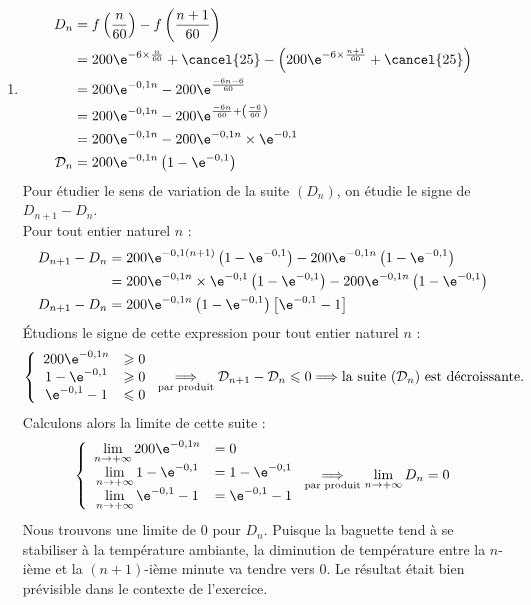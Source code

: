 \begin{enumerate}
\begin{enumerate}
\item \begin{align*}
{D}_n &=f\left(\dfrac{n}{60}\right)- f\left(\dfrac{n+1}{60}\right) \\
&= 200\e^{- 6 \times \frac{n}{60}} + \cancel{25} - \left(200\e^{-6 \times \frac{n+1}{60}} + \cancel{25}     \right) \\
&= 200\e^{-0,1n} - 200\e^{\frac{-6n-6}{60}} \\
&= 200\e^{-0,1n} - 200\e^{\frac{-6n}{60} + \left(\frac{-6}{60}\right)} \\
&= 200\e^{-0,1n} - 200\e^{-0,1n} \times \e^{-0,1} \\
\mathcal{D}_n &= 200\e^{-0,1n}\left(1-\e^{-0,1}\right)
\end{align*}
Pour étudier le sens de variation de la suite $({D}_n)$, on étudie le signe de ${D}_{n+1}-{D}_n$. \\
Pour tout entier naturel $n$ : 
\begin{align*}
{D}_{n+1}-{D}_n &= 200\e^{-0,1(n+1)}\left(1-\e^{-0,1}\right) - 200\e^{-0,1n}\left(1-\e^{-0,1}\right) \\
&= 200\e^{-0,1n} \times \e^{-0,1} \left(1-\e^{-0,1}\right)- 200\e^{-0,1n}\left(1-\e^{-0,1}\right) \\
{D}_{n+1}-{D}_n &= 200\e^{-0,1n}\left(1-\e^{-0,1}\right) \left[\e^{-0,1}-1\right]
\end{align*}
Étudions le signe de cette expression pour tout entier naturel $n$ : 
\begin{equation*}
\left\{\begin{array}{cc}
200\e^{-0,1n} &\geqslant 0  \\
1-\e^{-0,1} &\geqslant 0 \\
\e^{-0,1}-1 &\leqslant 0
\end{array}\right .
\underset{\text{par produit}}{\Longrightarrow} \mathcal{D}_{n+1}-\mathcal{D}_n \leqslant 0 \Longrightarrow \text{la suite} \ (\mathcal{D}_n) \ \text{est décroissante}.
 \end{equation*}
 Calculons alors la limite de cette suite : 
 \begin{equation*}
\left\{\begin{array}{cl}
\lim\limits_{n \rightarrow + \infty} 200\e^{-0,1n} &= 0  \\
\lim\limits_{n \rightarrow + \infty} 1-\e^{-0,1} &= 1-\e^{-0,1} \\
\lim\limits_{n \rightarrow + \infty} \e^{-0,1}-1 &= \e^{-0,1} -1
\end{array} \right .
\underset{\text{par produit}}{\Longrightarrow} \lim\limits_{n \rightarrow + \infty} {D}_n=0
\end{equation*}
Nous trouvons une limite de $0$ pour ${D}_n$. Puisque la baguette tend à se stabiliser à la température ambiante, la diminution de température entre la $n$-ième  et la $(n+1)$-ième minute va tendre vers $0$. Le résultat était bien prévisible dans le contexte de l'exercice. 
		\end{enumerate}
\end{enumerate}
